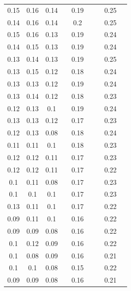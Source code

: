 \documentclass[AutoFakeBold]{LZUThesis}
\begin{document}
\begin{longtable}{ccccccccc}
0.15   & 0.16   & 0.14   &       & 0.19  &      &       & 0.25  &      \\
0.14   & 0.16   & 0.14   &       & 0.2   &      &       & 0.25  &      \\
0.15   & 0.16   & 0.13   &       & 0.19  &      &       & 0.24  &      \\
0.14   & 0.15   & 0.13   &       & 0.19  &      &       & 0.24  &      \\
0.13   & 0.14   & 0.13   &       & 0.19  &      &       & 0.25  &      \\
0.13   & 0.15   & 0.12   &       & 0.18  &      &       & 0.24  &      \\
0.13   & 0.13   & 0.12   &       & 0.19  &      &       & 0.24  &      \\
0.13   & 0.14   & 0.12   &       & 0.18  &      &       & 0.23  &      \\
0.12   & 0.13   & 0.1    &       & 0.19  &      &       & 0.24  &      \\
0.13   & 0.13   & 0.12   &       & 0.17  &      &       & 0.23  &      \\
0.12   & 0.13   & 0.08   &       & 0.18  &      &       & 0.24  &      \\
0.11   & 0.11   & 0.1    &       & 0.18  &      &       & 0.23  &      \\
0.12   & 0.12   & 0.11   &       & 0.17  &      &       & 0.23  &      \\
0.12   & 0.12   & 0.11   &       & 0.17  &      &       & 0.22  &      \\
0.1    & 0.11   & 0.08   &       & 0.17  &      &       & 0.23  &      \\
0.1    & 0.1    & 0.1    &       & 0.17  &      &       & 0.23  &      \\
0.13   & 0.11   & 0.1    &       & 0.17  &      &       & 0.22  &      \\
0.09   & 0.11   & 0.1    &       & 0.16  &      &       & 0.22  &      \\
0.09   & 0.09   & 0.08   &       & 0.16  &      &       & 0.22  &      \\
0.1    & 0.12   & 0.09   &       & 0.16  &      &       & 0.22  &      \\
0.1    & 0.08   & 0.09   &       & 0.16  &      &       & 0.21  &      \\
0.1    & 0.1    & 0.08   &       & 0.15  &      &       & 0.22  &      \\
0.09   & 0.09   & 0.08   &       & 0.16  &      &       & 0.21  &      \\

\end{longtable}
\end{document}
